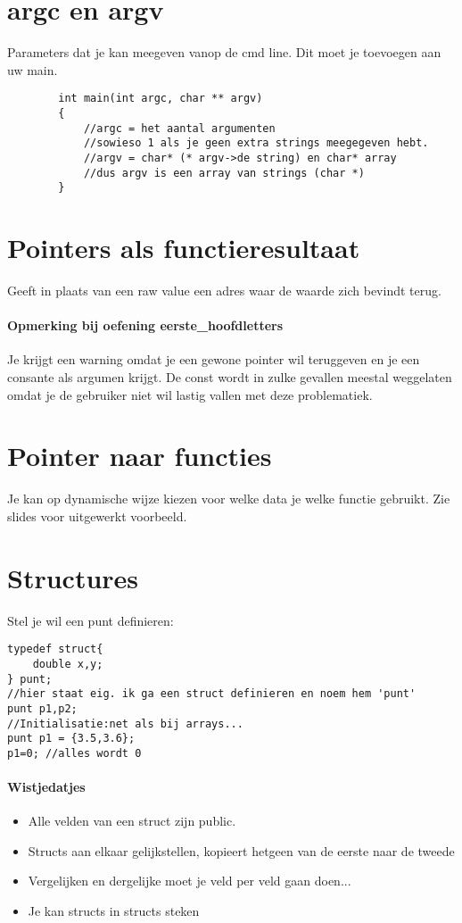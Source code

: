 \documentclass{article}
\begin{document}
\section{argc en argv}
    Parameters dat je kan meegeven vanop de cmd line.
    Dit moet je toevoegen aan uw main.
    \begin{lstlisting}
        int main(int argc, char ** argv)
        {
            //argc = het aantal argumenten  
            //sowieso 1 als je geen extra strings meegegeven hebt.
            //argv = char* (* argv->de string) en char* array 
            //dus argv is een array van strings (char *)
        }
    \end{lstlisting}
\section{Pointers als functieresultaat}
Geeft in plaats van een raw value een adres waar de waarde zich bevindt terug.  
\paragraph{Opmerking bij oefening eerste\_hoofdletters}
Je krijgt een warning omdat je een gewone pointer wil teruggeven en je een consante als argumen krijgt. 
De const wordt in zulke gevallen meestal weggelaten omdat je de gebruiker niet wil lastig vallen met deze problematiek.
\section{Pointer naar functies}
Je kan op dynamische wijze kiezen voor welke data je welke functie gebruikt.
Zie slides voor uitgewerkt voorbeeld.
\section{Structures}
Stel je wil een punt definieren:
\begin{lstlisting}
typedef struct{
    double x,y;
} punt;
//hier staat eig. ik ga een struct definieren en noem hem 'punt'
punt p1,p2;
//Initialisatie:net als bij arrays...
punt p1 = {3.5,3.6};
p1=0; //alles wordt 0
\end{lstlisting}
\paragraph{Wistjedatjes}
\begin{itemize}
    \item Alle velden van een struct zijn public.
    \item Structs aan elkaar gelijkstellen, kopieert hetgeen van de eerste naar de tweede
    \item Vergelijken en dergelijke moet je veld per veld gaan doen...
    \item Je kan structs in structs steken
\end{itemize}
\end{document}

